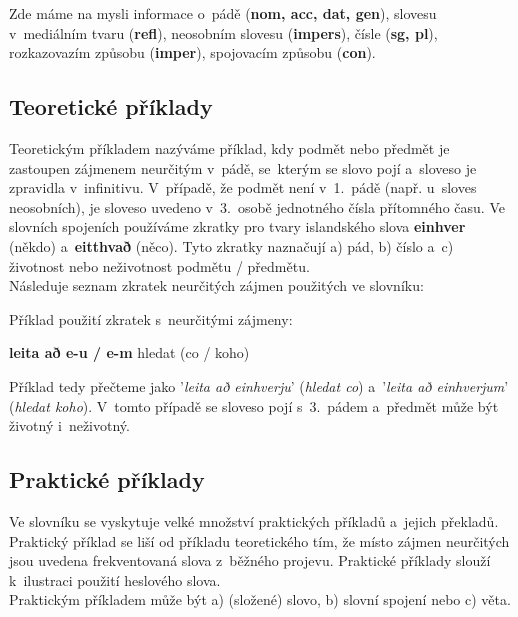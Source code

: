 Zde máme na mysli informace o~pádě (\textbf{nom, acc, dat, gen}), slovesu v~mediálním tvaru (\textbf{refl}), neosobním slovesu (\textbf{impers}), čísle (\textbf{sg, pl}), rozkazovazím způsobu (\textbf{imper}), spojovacím způsobu (\textbf{con}).

\subsection*{Teoretické příklady}

Teoretickým příkladem nazýváme příklad, kdy podmět nebo předmět je zastoupen zájmenem neurčitým v~pádě, se~kterým se slovo pojí a~sloveso je zpravidla v~infinitivu. V~případě, že podmět není v~1.~pádě (např. u~sloves neosobních), je sloveso uvedeno v~3.~osobě jednotného čísla přítomného času.
Ve slovních spojeních používáme zkratky pro tvary islandského slova \textbf{einhver} (někdo) a~\textbf{eitthvað} (něco). Tyto zkratky naznačují a) pád, b) číslo a~c) životnost nebo neživotnost podmětu / předmětu.\\
Následuje seznam zkratek neurčitých zájmen použitých ve slovníku: \\

\tableD

Příklad použití zkratek s~neurčitými zájmeny:

\blspace
  \dicEntry {}   \textbf{leita að e-u / e-m} {hledat (co / koho)}  
\blspace

Příklad tedy přečteme jako '\textit{leita að einhverju}' (\textit{hledat co}) a~'\textit{leita að einhverjum}' (\textit{hledat koho}). V~tomto případě se sloveso pojí s~3.~pádem a~předmět může být životný i~neživotný.

\subsection*{Praktické příklady}

Ve slovníku se vyskytuje velké množství praktických příkladů a~jejich překladů. Praktický příklad se liší od příkladu teoretického tím, že místo zájmen neurčitých jsou uvedena frekventovaná slova z~běžného projevu. Praktické příklady slouží k~ilustraci použití
heslového slova.\\
Praktickým příkladem může být a) (složené) slovo, b) slovní spojení nebo c) věta.

